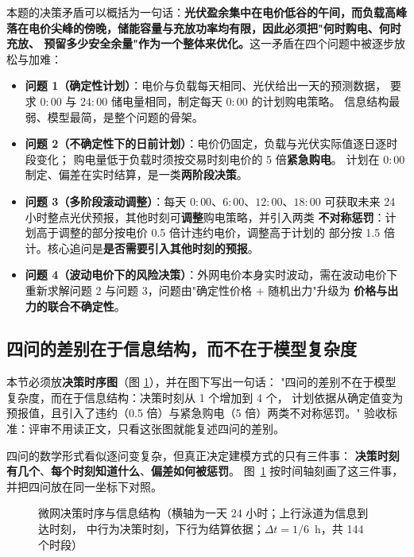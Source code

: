 本题的决策矛盾可以概括为一句话：\textbf{光伏盈余集中在电价低谷的午间，而负载高峰
落在电价尖峰的傍晚，储能容量与充放功率均有限，因此必须把"何时购电、何时充放、
预留多少安全余量"作为一个整体来优化。}这一矛盾在四个问题中被逐步放松与加难：

\begin{itemize}
  \item \textbf{问题 1（确定性计划）}：电价与负载每天相同、光伏给出一天的预测数据，
        要求 \(0{:}00\) 与 \(24{:}00\) 储电量相同，制定每天 \(0{:}00\) 的计划购电策略。
        信息结构最弱、模型最简，是整个问题的骨架。
  \item \textbf{问题 2（不确定性下的日前计划）}：电价仍固定，负载与光伏实际值逐日逐时段变化；
        购电量低于负载时须按交易时刻电价的 5 倍\textbf{紧急购电}。
        计划在 \(0{:}00\) 制定、偏差在实时结算，是一类\textbf{两阶段决策}。
  \item \textbf{问题 3（多阶段滚动调整）}：每天 \(0{:}00\)、\(6{:}00\)、\(12{:}00\)、\(18{:}00\)
        可获取未来 24 小时整点光伏预报，其他时刻可\textbf{调整}购电策略，并引入两类
        \textbf{不对称惩罚}：计划高于调整的部分按电价 0.5 倍计违约电价，调整高于计划的
        部分按 1.5 倍计。核心追问是\textbf{是否需要引入其他时刻的预报}。
  \item \textbf{问题 4（波动电价下的风险决策）}：外网电价本身实时波动，需在波动电价下
        重新求解问题 2 与问题 3，问题由"确定性价格 + 随机出力"升级为
        \textbf{价格与出力的联合不确定性}。
\end{itemize}

\subsection{四问的差别在于信息结构，而不在于模型复杂度}

\begin{guideblock}
本节必须放\textbf{决策时序图}（图 \ref{fig:timeline}），并在图下写出一句话：
"四问的差别不在于模型复杂度，而在于信息结构：决策时刻从 1 个增加到 4 个，
计划依据从确定值变为预报值，且引入了违约（0.5 倍）与紧急购电（5 倍）两类不对称惩罚。"
验收标准：评审不用读正文，只看这张图就能复述四问的差别。
\end{guideblock}

四问的数学形式看似逐问变复杂，但真正决定建模方式的只有三件事：
\textbf{决策时刻有几个}、\textbf{每个时刻知道什么}、\textbf{偏差如何被惩罚}。
图~\ref{fig:timeline} 按时间轴刻画了这三件事，并把四问放在同一坐标下对照。

\begin{figure}[htbp]
  \centering
  
  \caption{微网决策时序与信息结构（横轴为一天 24 小时；上行泳道为信息到达时刻，
           中行为决策时刻，下行为结算依据；\(\Delta t=1/6\)~h，共 144 个时段）}
  \label{fig:timeline}
\end{figure}

